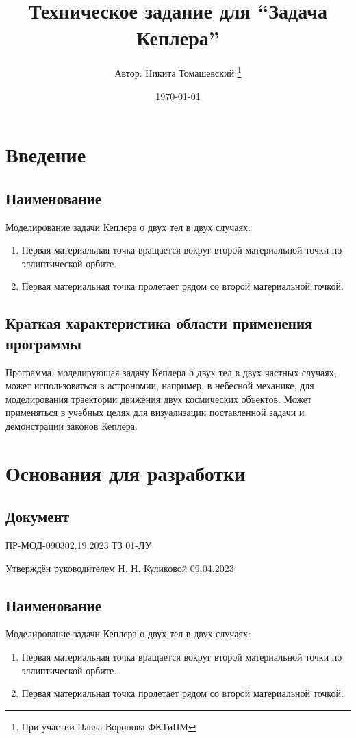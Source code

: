 

\title{Техническое задание для ``Задача Кеплера''}
\author{Автор: Никита Томашевский \thanks{При участии Павла Воронова ФКТиПМ}}
\date{\today}


 \maketitle\newpage
 \tableofcontents\newpage
 \section{Введение}
 \subsection{Наименование}
 Моделирование задачи Кеплера о двух тел в двух случаях:
 \begin{enumerate}
  \item Первая материальная точка вращается вокруг второй материальной точки по эллиптической орбите.
  \item Первая материальная точка пролетает рядом со второй материальной точкой.
 \end{enumerate}
 \subsection{Краткая характеристика области применения программы}
 Программа, моделирующая задачу Кеплера о двух тел в двух частных случаях, может использоваться в астрономии, например, в небесной механике, для моделирования траектории движения двух космических объектов. Может применяться в учебных целях для визуализации поставленной задачи и демонстрации законов Кеплера.
 \section{Основания для разработки}
 \subsection{Документ}
 ПР-МОД-090302.19.2023 ТЗ 01-ЛУ

 Утверждён руководителем Н. Н. Куликовой 09.04.2023
 \subsection{Наименование}
 Моделирование задачи Кеплера о двух тел в двух случаях:
 \begin{enumerate}
  \item Первая материальная точка вращается вокруг второй материальной точки по эллиптической орбите.
  \item Первая материальная точка пролетает рядом со второй материальной точкой.
 \end{enumerate}
